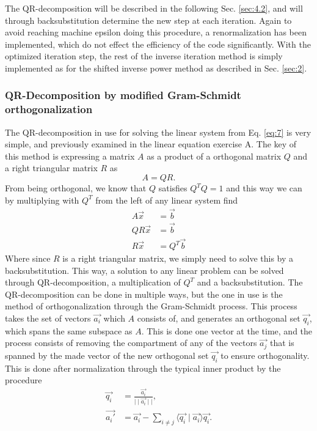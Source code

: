 \documentclass[twocolumn]{article}
\begin{document}
The QR-decomposition will be described in the following Sec. \ref{sec:4.2}, and will through backsubstitution determine the new step at each iteration. Again to avoid reaching machine epsilon doing this procedure, a renormalization has been implemented, which do not effect the efficiency of the code significantly. With the optimized iteration step, the rest of the inverse iteration method is simply implemented as for the shifted inverse power method as described in Sec. \ref{sec:2}.

\subsubsection{\label{sec:4.2}QR-Decomposition by modified Gram-Schmidt orthogonalization}
The QR-decomposition in use for solving the linear system from Eq. \eqref{eq:7} is very simple, and previously examined in the linear equation exercise A. The key of this method is expressing a matrix $A$ as a product of a orthogonal matrix $Q$ and a right triangular matrix $R$ as
\begin{equation}
A = QR.
\end{equation}
From being orthogonal, we know that $Q$ satisfies $Q^T Q = 1$ and this way we can by multiplying with $Q^T$ from the left of any linear system find
\begin{align}
A \vec{x} &= \vec{b}\\
QR \vec{x} &= \vec{b}\\
R \vec{x} &= Q^T \vec{b}
\end{align}
Where since $R$ is a right triangular matrix, we simply need to solve this by a backsubstitution. This way, a solution to any linear problem can be solved through QR-decomposition, a multiplication of $Q^T$ and a backsubstitution. The QR-decomposition can be done in multiple ways, but the one in use is the method of orthogonalization through the Gram-Schmidt process. This process takes the set of vectors $\vec{a_i}$ which $A$ consists of, and generates an orthogonal set $\vec{q_i}$, which spans the same subspace as $A$. This is done one vector at the time, and the process consists of removing the compartment of any of the vectors $\vec{a_j}$ that is spanned by the made vector of the new orthogonal set $\vec{q_i}$ to ensure orthogonality. This is done after normalization through the typical inner product by the procedure
\begin{align}
\vec{q_i} &= \frac{\vec{a_i}}{\mid \mid \vec{a_i} \mid \mid} ,\label{eq:norm}\\
\vec{a_i'} &= \vec{a_i} - \sum_{i \neq j} \langle \vec{q_i} \mid \vec{a_i} \rangle \vec{q_i}. \label{eq:project}
\end{align}
\end{document}
